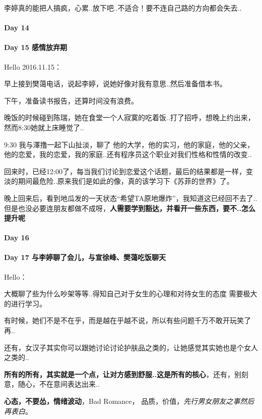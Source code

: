 \documentclass[UTF8,a4paper,8pt]{ctexbook}
\begin{document}
	 	 李婷真的能把人搞疯，心累..放下吧..不适合！要不连自己路的方向都会失去..
 	 \paragraph{Day 14      \quad     }
 	 \paragraph{Day 15   感情放弃期   \quad     }
	 	 Hello 2016.11.15：
	 	 
	 	 早上接到樊蔼电话，说起李婷，说她好像对我有意思..然后准备借本书。
	 	 
	 	 下午，准备读书报告，还算时间没有浪费。
	 	 
	 	 晚饭的时候碰到陈瑞，她在食堂一个人寂寞的吃着饭..打了招呼，想晚上约出来，然而8:30她就上床睡觉了..
	 	 
	 	 9:30 我与澤撸一起下山扯淡，聊了 他的大学，他的实习，他的家庭，他的父亲，他的恋爱，我的恋爱，我的家庭..还有程序员这个职业对我们性格和性情的改变..
	 	 
	 	 回来时，已经12:00了，每当我们讨论到恋爱这个话题，最后的结果都是一样，变淡的期间最危险..原来我们是如此的像，真的该学习下《苏菲的世界》了。
	 	 
	 	 晚上回来后，看到地瓜发的一天状态“希望TA原地爆炸”，我知道这已经回不去了..但是也没必要连朋友都做不成呀，\textbf{人需要学到豁达，并看开一些东西，要不..怎么提升呢}
	 	 
 	 \paragraph{Day 16      \quad     }
 	 \paragraph{Day 17  与李婷聊了会儿，与宣徐峰、樊蔼吃饭聊天    \quad     }
	 	 Hello：
	 	 
	 	 大概聊了些为什么吵架等等..得知自己对于女生的心理和对待女生的态度 需要极大的进行学习。
	 	 
	 	 有时候，她们不是不在乎，而是越在乎越不说，所以有些问题千万不敢开玩笑了再..
	 	 
	 	 还有，女汉子其实你可以跟她讨论讨论护肤品之类的，让她感觉其实她也是个女人之类的..
	 	 
	 	 \textbf{所有的所有，其实就是一个点，让对方感到舒服..这是所有的核心}，还有，别刻意，随心，不在意间表达出来..
	 	 
	 	 \textbf{心态，不要怂，情绪波动}，Bad Romance， 品质，价值，\textit{先行男女朋友之事然后再表白}。
	 	 
\end{document}
